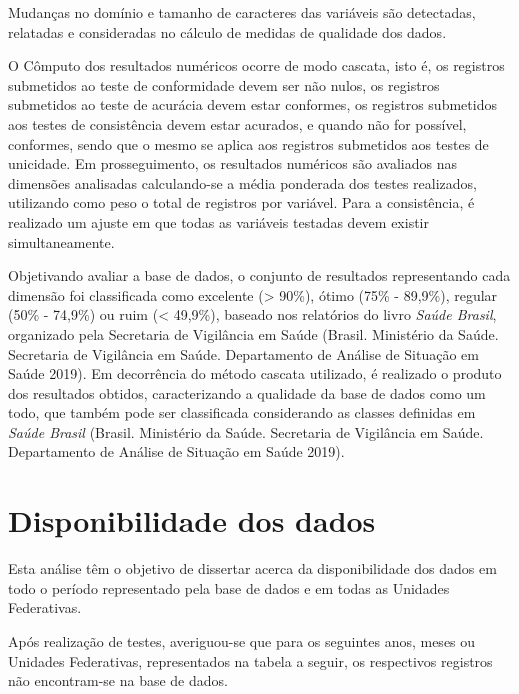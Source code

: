 \documentclass[
  12,
  table]{proadi}
\begin{document}
Mudanças no domínio e tamanho de caracteres das variáveis são
detectadas, relatadas e consideradas no cálculo de medidas de qualidade
dos dados.

O Cômputo dos resultados numéricos ocorre de modo cascata, isto é, os
registros submetidos ao teste de conformidade devem ser não nulos, os
registros submetidos ao teste de acurácia devem estar conformes, os
registros submetidos aos testes de consistência devem estar acurados, e
quando não for possível, conformes, sendo que o mesmo se aplica aos
registros submetidos aos testes de unicidade. Em prosseguimento, os
resultados numéricos são avaliados nas dimensões analisadas
calculando-se a média ponderada dos testes realizados, utilizando como
peso o total de registros por variável. Para a consistência, é realizado
um ajuste em que todas as variáveis testadas devem existir
simultaneamente.

Objetivando avaliar a base de dados, o conjunto de resultados
representando cada dimensão foi classificada como excelente
(\textgreater{} 90\%), ótimo (75\% - 89,9\%), regular (50\% - 74,9\%) ou
ruim (\textless{} 49,9\%), baseado nos relatórios do livro \emph{Saúde
Brasil}, organizado pela Secretaria de Vigilância em Saúde (Brasil.
Ministério da Saúde. Secretaria de Vigilância em Saúde. Departamento de
Análise de Situação em Saúde 2019). Em decorrência do método cascata
utilizado, é realizado o produto dos resultados obtidos, caracterizando
a qualidade da base de dados como um todo, que também pode ser
classificada considerando as classes definidas em \emph{Saúde Brasil}
(Brasil. Ministério da Saúde. Secretaria de Vigilância em Saúde.
Departamento de Análise de Situação em Saúde 2019).

\hypertarget{disponibilidade-dos-dados}{%
\section{Disponibilidade dos dados}\label{disponibilidade-dos-dados}}

Esta análise têm o objetivo de dissertar acerca da disponibilidade dos
dados em todo o período representado pela base de dados e em todas as
Unidades Federativas.

Após realização de testes, averiguou-se que para os seguintes anos,
meses ou Unidades Federativas, representados na tabela a seguir, os
respectivos registros não encontram-se na base de dados.

\begingroup\fontsize{10}{12}\selectfont
\end{document}
